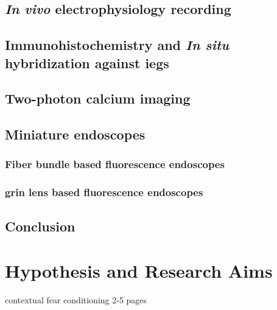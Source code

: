\subsection{\textit{In vivo} electrophysiology recording}
\subsection{Immunohistochemistry and \textit{In situ} hybridization against \glspl{ieg}}
\subsection{Two-photon calcium imaging}
\subsection{Miniature endoscopes}
\subsubsection{Fiber bundle based fluorescence endoscopes}
\subsubsection{\gls{grin} lens based fluorescence endoscopes}
\subsection{Conclusion}


\section{Hypothesis and Research Aims}
\citep{rozeske14} contextual fear conditioning
2-5 pages
